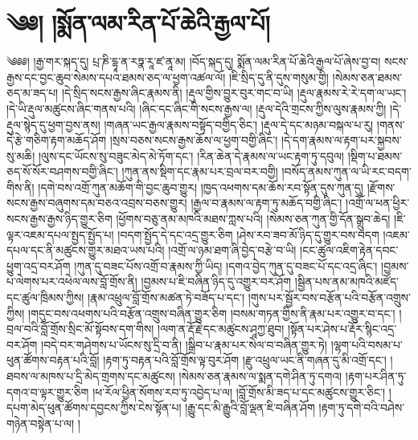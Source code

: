 \chapter{༄༅། །སྨོན་ལམ་རིན་པོ་ཆེའི་རྒྱལ་པོ།}༄༅༅། །རྒྱ་གར་སྐད་དུ། པྲ་ཎི་དྷཱ་ན་རཏྣ་རཱ་ཛ་ནཱ་མ། །བོད་སྐད་དུ། སྨོན་ལམ་རིན་པོ་ཆེའི་རྒྱལ་པོ་ཞེས་བྱ་བ། སངས་རྒྱས་དང་བྱང་ཆུབ་སེམས་དཔའ་ཐམས་ཅད་ལ་ཕྱག་འཚལ་ལོ། །ཇི་སྲིད་དུ་ནི་དུས་གསུམ་གྱི། །སེམས་ཅན་ཐམས་ཅད་མ་ཟད་པ། །དེ་སྲིད་སངས་རྒྱས་ཞིང་རྣམས་ནི། །རྡུལ་གྱིས་བྱུར་བུར་གང་བ་ཡི། །རྡུལ་རྣམས་རེ་རེ་དག་ལ་ཡང་། །དེ་ཡི་རྡུལ་མཚུངས་ཞིང་གནས་པའི། །ཞིང་དང་ཞིང་གི་སངས་རྒྱས་ལ། །རྡུལ་དེའི་གྲངས་ཀྱིས་ལུས་རྣམས་ཀྱི། །དེ་རྡུལ་སྙེད་དུ་ཕྱག་བྱས་ནས། །གཞན་ཡང་རྒྱལ་རྣམས་བསྟོད་བགྱིད་ཅིང་། །རྡུལ་དེ་དང་མཉམ་བསྐལ་པ་རུ། །གནས་དེ་རྩེ་གཅིག་རྟག་མཆོད་ཤོག །སྲས་བཅས་སངས་རྒྱས་ཆོས་ལ་ཕྱག་བགྱི་ཞིང་། །དེ་དག་རྣམས་ལ་རྟག་པར་སྐྱབས་སུ་མཆི། །ལུས་དང་ཡོངས་སུ་བཟུང་མེད་མེ་ཏོག་དང་། །རིན་ཆེན་དེ་རྣམས་ལ་ཡང་རྟག་ཏུ་དབུལ། །སྡིག་པ་ཐམས་ཅད་སོ་སོར་བཤགས་བགྱི་ཞིང་། །ཀུན་ནས་སྡིག་དང་རྣམ་པར་བྲལ་བར་བགྱི། །བསོད་ནམས་ཀུན་ལ་ཡི་རང་བདག་གིས་ནི། །དགེ་བས་འགྲོ་ཀུན་མཆོག་གི་བྱང་ཆུབ་གྱུར། །ཁྱད་འཕགས་དམ་ཆོས་རབ་སྟོན་དུས་ཀུན་དུ། །རྫོགས་སངས་རྒྱས་བཞུགས་དམ་བཅའ་འབྲས་བཅས་གྱུར། །རྒྱལ་བ་རྣམས་ལ་རྟག་ཏུ་མཆོད་བགྱི་ཞིང་། །འགྲོ་ལ་ཕན་ཕྱིར་སངས་རྒྱས་རྒྱས་ཉིད་གྱུར་ཅིག །ཕྱོགས་བཅུ་ནམ་མཁའི་མཐས་ཀླས་པའི། །སེམས་ཅན་ཀུན་གྱི་དོན་སྒྲུབ་ཆེད། །ཇི་ལྟར་འཇམ་དཔལ་སྤྱད་སྤྱོད་པ། །བདག་སྤྱོད་དེ་དང་འདྲ་གྱུར་ཅིག །ཤེས་རབ་ཟབ་མོ་ཉིད་དུ་གྱུར་བས་བདག །འཇམ་དཔལ་དང་ནི་མཚུངས་གྱུར་མཐའ་ཡས་པའི། །འགྲོ་ལ་ཉམ་ཐག་ཞི་བྱེད་བརྩེ་བ་ཡི། །ངང་ཚུལ་འཇིག་རྟེན་དབང་ཕྱུག་འདྲ་བར་ཤོག །ཀུན་དུ་བཟང་པོས་འགྲོ་བ་རྣམས་ཀྱི་ཡིད། །དགའ་བྱེད་ཀུན་དུ་བཟང་པོ་དང་འདྲ་ཞིང་། །བྱམས་པ་ལེགས་པར་འཕེལ་ལས་བློ་གྲོས་ནི། །བྱམས་པ་ཇི་བཞིན་ཉིད་དུ་འགྱུར་བར་ཤོག །སྦྱིན་པས་ནམ་མཁའི་མཛོད་དང་ཚུལ་ཁྲིམས་ཀྱིས། །རྣམ་འཕྲུལ་བློ་གྲོས་མཚན་ཏེ་བཟོད་པ་དང་། །གུས་པར་སྦྱོར་བས་བརྩོན་པའི་བརྩོན་འགྲུས་ཀྱིས། །གདུང་བས་འཕགས་པའི་བརྩོན་འགྲུས་བཞིན་གྱུར་ཅིག །བསམ་གཏན་གྱིས་ནི་རྣམ་པར་འགྱུར་བ་དང་། །བྲལ་བའི་བློ་གྲོས་སྲིང་མོ་སྟོབས་དག་གིས། །ལག་ན་རྡོ་རྗེ་དང་མཚུངས་ཤཱཀྱ་ཐུབ། །སྟོན་པར་ཤེས་པ་རྡོར་སྙིང་འདྲ་བར་ཤོག །བདེ་བར་གཤེགས་པ་ཡོངས་སུ་དྲི་བ་ནི། །སྒྲིབ་པ་རྣམ་པར་སེལ་བ་བཞིན་གྱུར་ཏེ། །ལྷག་པའི་བསམ་པ་ཕུན་ཚོགས་བརྟན་པའི་བློ། །རྟག་ཏུ་བརྟན་པའི་བློ་གྲོས་ལྟ་བུར་ཤོག །རྫུ་འཕྲུལ་ཡང་ནི་གཞན་དུ་མི་འགྲོ་དང་། །ཐབས་ལ་མཁས་པ་དྲི་མེད་གྲགས་དང་མཚུངས། །སེམས་ཅན་རྣམས་ལ་སྨན་དགེ་ཤིན་ཏུ་དགའ། །རྟག་པར་ཤིན་ཏུ་དགའ་བ་ལྟར་གྱུར་ཅིག །ཕ་རོལ་ཕྱིན་སོགས་རབ་ཏུ་འབྱེད་པ་ལ། །བློ་གྲོས་མི་ཟད་པ་དང་མཚུངས་གྱུར་ཅིང་། །དཔག་མེད་ཕུན་ཚོགས་དབྱངས་ཀྱིས་ངེས་སྟོན་པ། །རྒྱུ་དང་མི་རྒྱུའི་བློ་ལྡན་ཇི་བཞིན་ཤོག །རྟག་ཏུ་དགེ་བའི་བཤེས་གཉེན་བསྟེན་པ་ལ། །
